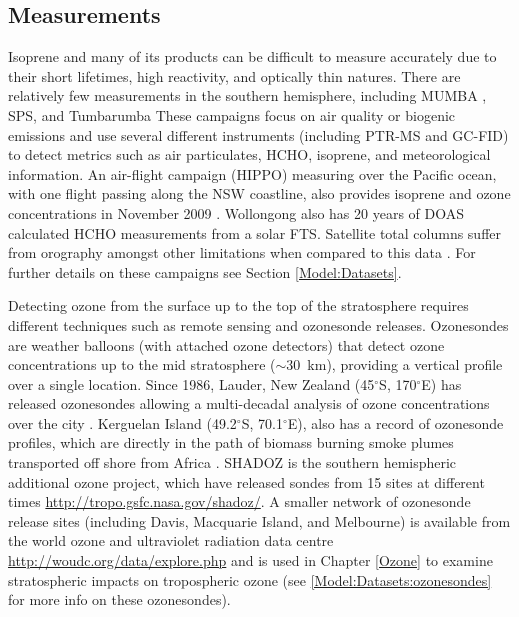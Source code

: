   
  \subsection{Measurements}
    
    Isoprene and many of its products can be difficult to measure accurately due to their short lifetimes, high reactivity, and optically thin natures.
    There are relatively few measurements in the southern hemisphere, including MUMBA \parencite{PatonWalsh2013}, SPS\parencite{Dunne2018}, and Tumbarumba \parencite{Emmerson2016}
    These campaigns focus on air quality or biogenic emissions and use several different instruments (including PTR-MS and GC-FID) to detect metrics such as air particulates, HCHO, isoprene, and meteorological information.
    An air-flight campaign (HIPPO) measuring over the Pacific ocean, with one flight passing along the NSW coastline, also provides isoprene and ozone concentrations in November 2009 \parencite{Wolfsy2011}.
    Wollongong also has 20 years of DOAS calculated HCHO measurements from a solar FTS. 
    Satellite total columns suffer from orography amongst other limitations when compared to this data \parencite{Demol2010}.
    For further details on these campaigns see Section \ref{Model:Datasets}.
    
    Detecting ozone from the surface up to the top of the stratosphere requires different techniques such as remote sensing and ozonesonde releases.
    Ozonesondes are weather balloons (with attached ozone detectors) that detect ozone concentrations up to the mid stratosphere ($\sim 30$~km), providing a vertical profile over a single location.
    Since 1986, Lauder, New Zealand (45$^{\circ}$S, 170$^{\circ}$E) has released ozonesondes allowing a multi-decadal analysis of ozone concentrations over the city \parencite{Brinksma2002}.
    Kerguelan Island (49.2$^{\circ}$S, 70.1$^{\circ}$E), also has a record of ozonesonde profiles, which are directly in the path of biomass burning smoke plumes transported off shore from Africa \parencite{Baray2012}.
    SHADOZ is the southern hemispheric additional ozone project, which have released sondes from 15 sites at different times \url{http://tropo.gsfc.nasa.gov/shadoz/}.
    A smaller network of ozonesonde release sites (including Davis, Macquarie Island, and Melbourne) is available from the world ozone and ultraviolet radiation data centre \url{http://woudc.org/data/explore.php} and is used in Chapter \ref{Ozone} to examine stratospheric impacts on tropospheric ozone (see \ref{Model:Datasets:ozonesondes} for more info on these ozonesondes).
  
